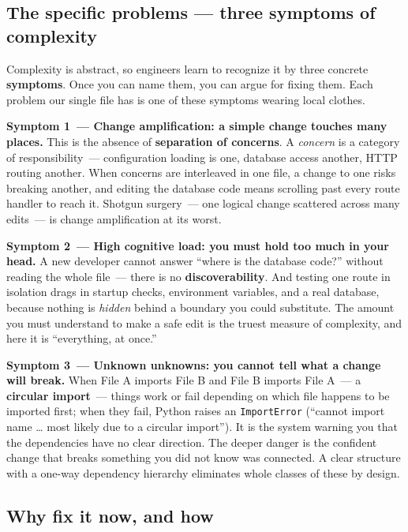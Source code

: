 \subsection*{The specific problems --- three symptoms of complexity}\label{15-structuring-the-application:the-specific-problems--three-symptoms-of-complexity}

Complexity is abstract, so engineers learn to recognize it by three concrete \textbf{symptoms}. Once you can name them, you can argue for fixing them. Each problem our single file has is one of these symptoms wearing local clothes.

\textbf{Symptom 1~--- Change amplification: a simple change touches many places.} This is the absence of \textbf{separation of concerns}. A \emph{concern} is a category of responsibility~--- configuration loading is one, database access another, HTTP routing another. When concerns are interleaved in one file, a change to one risks breaking another, and editing the database code means scrolling past every route handler to reach it. Shotgun surgery~--- one logical change scattered across many edits~--- is change amplification at its worst.

\textbf{Symptom 2~--- High cognitive load: you must hold too much in your head.} A new developer cannot answer ``where is the database code?'' without reading the whole file~--- there is no \textbf{discoverability}. And testing one route in isolation drags in startup checks, environment variables, and a real database, because nothing is \emph{hidden} behind a boundary you could substitute. The amount you must understand to make a safe edit is the truest measure of complexity, and here it is ``everything, at once.''

\textbf{Symptom 3~--- Unknown unknowns: you cannot tell what a change will break.} When File A imports File B and File B imports File A~--- a \textbf{circular import}~--- things work or fail depending on which file happens to be imported first; when they fail, Python raises an \texttt{ImportError} (``cannot import name \ldots{} most likely due to a circular import''). It is the system warning you that the dependencies have no clear direction. The deeper danger is the confident change that breaks something you did not know was connected. A clear structure with a one-way dependency hierarchy eliminates whole classes of these by design.

\subsection*{Why fix it now, and how}\label{15-structuring-the-application:why-fix-it-now-and-how}

